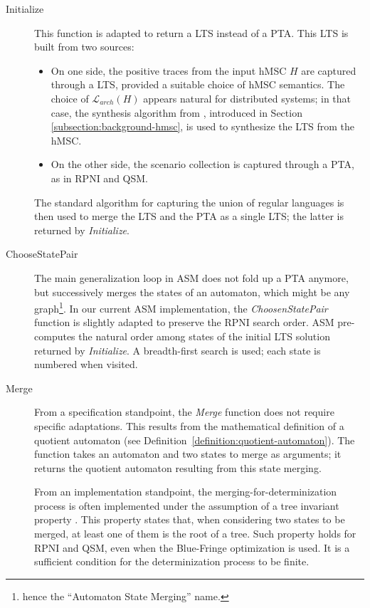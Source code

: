 \begin{description}

\item[Initialize] This function is adapted to return a LTS instead of a PTA. This LTS is built from two sources:
\begin{itemize}
\item On one side, the positive traces from the input hMSC $H$ are captured through a LTS, provided a suitable choice of hMSC semantics. The choice of $\mathcal{L}_{arch}(H)$ appears natural for distributed systems; in that case, the synthesis algorithm from \cite{Uchitel:2003}, introduced in Section \ref{subsection:background-hmsc}, is used to synthesize the LTS from the hMSC.
\item On the other side, the scenario collection is captured through a PTA, as in RPNI and QSM.
\end{itemize}
The standard algorithm for capturing the union of regular languages is then used \cite{Hopcroft:1979} to merge the LTS and the PTA as a single LTS; the latter is returned by \emph{Initialize}.

\item[ChooseStatePair] The main generalization loop in ASM does not fold up a PTA anymore, but successively merges the states of an automaton, which might be any graph\footnote{hence the ``Automaton State Merging'' name.}. In our current ASM implementation, the \emph{ChoosenStatePair} function is slightly adapted to preserve the RPNI search order. ASM pre-computes the natural order among states of the initial LTS solution returned by \emph{Initialize}. A breadth-first search is used; each state is numbered when visited.

\item[Merge] From a specification standpoint, the \emph{Merge} function does not require specific adaptations. This results from the mathematical definition of a quotient automaton (see Definition~\ref{definition:quotient-automaton}). The function takes an automaton and two states to merge as arguments; it returns the quotient automaton resulting from this state merging. 

From an implementation standpoint, the merging-for-determinization process is often implemented under the assumption of a tree invariant property \cite{Lang:1998}. This property states that, when considering two states to be merged, at least one of them is the root of a tree. Such property holds for RPNI and QSM, even when the Blue-Fringe optimization is used. It is a sufficient condition for the determinization process to be finite. 


\end{description}
